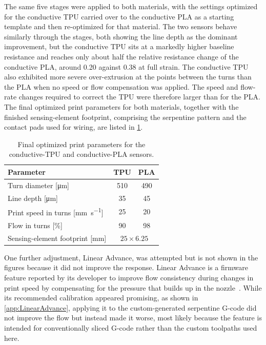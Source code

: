 The same five stages were applied to both materials, with the settings optimized for the conductive TPU carried over to the conductive PLA as a starting template and then re-optimized for that material. The two sensors behave similarly through the stages, both showing the line depth as the dominant improvement, but the conductive TPU sits at a markedly higher baseline resistance and reaches only about half the relative resistance change of the conductive PLA, around \num{0.20} against \num{0.38} at full strain. The conductive TPU also exhibited more severe over-extrusion at the points between the turns than the PLA when no speed or flow compensation was applied. The speed and flow-rate changes required to correct the TPU were therefore larger than for the PLA. 
The final optimized print parameters for both materials, together with the finished sensing-element footprint, comprising the serpentine pattern and the contact pads used for wiring, are listed in \cref{tab:opt_params}.

\begin{table}
\centering
\caption{Final optimized print parameters for the conductive-TPU and conductive-PLA sensors.}
\label{tab:opt_params}
\begin{tabular}{@{}l c c@{}}
\toprule
Parameter & TPU & PLA \\
\midrule
Turn diameter [\si{\micro\meter}]            & 510 & 490 \\
Line depth [\si{\micro\meter}]               & 35 & 45 \\
Print speed in turns [\si{\milli\meter\per\second}] & 25 & 20 \\
Flow in turns [\si{\percent}]                & 90 & 98 \\
\midrule
Sensing-element footprint [\si{\milli\meter}]        & \multicolumn{2}{c}{$25 \times 6.25$} \\
\bottomrule
\end{tabular}
\end{table}

One further adjustment, Linear Advance, was attempted but is not shown in the figures because it did not improve the response. Linear Advance is a firmware feature reported by its developer to improve flow consistency during changes in print speed by compensating for the pressure that builds up in the nozzle~\cite{Lin_adv}. While its recommended calibration appeared promising, as shown in \cref{app:LinearAdvance}, applying it to the custom-generated serpentine G-code did not improve the flow but instead made it worse, most likely because the feature is intended for conventionally sliced G-code rather than the custom toolpaths used here.

